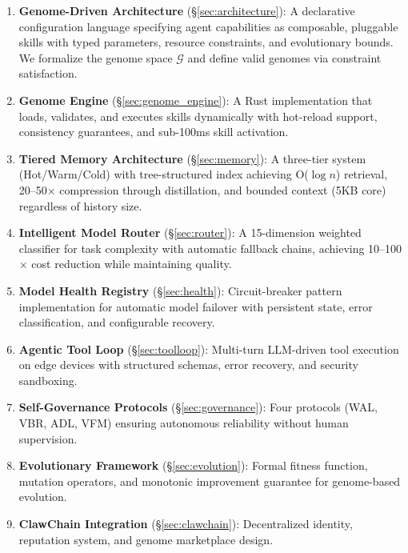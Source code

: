 \documentclass{article}
\newcommand{\genomespace}{\mathcal{G}}
\begin{document}
\begin{enumerate}[leftmargin=*]
    \item \textbf{Genome-Driven Architecture} (\S\ref{sec:architecture}): A declarative configuration language specifying agent capabilities as composable, pluggable skills with typed parameters, resource constraints, and evolutionary bounds. We formalize the genome space $\genomespace$ and define valid genomes via constraint satisfaction.
    
    \item \textbf{Genome Engine} (\S\ref{sec:genome_engine}): A Rust implementation that loads, validates, and executes skills dynamically with hot-reload support, consistency guarantees, and sub-100ms skill activation.
    
    \item \textbf{Tiered Memory Architecture} (\S\ref{sec:memory}): A three-tier system (Hot/Warm/Cold) with tree-structured index achieving O($\log n$) retrieval, 20--50$\times$ compression through distillation, and bounded context (5KB core) regardless of history size.
    
    \item \textbf{Intelligent Model Router} (\S\ref{sec:router}): A 15-dimension weighted classifier for task complexity with automatic fallback chains, achieving 10--100$\times$ cost reduction while maintaining quality.
    
    \item \textbf{Model Health Registry} (\S\ref{sec:health}): Circuit-breaker pattern implementation for automatic model failover with persistent state, error classification, and configurable recovery.
    
    \item \textbf{Agentic Tool Loop} (\S\ref{sec:toolloop}): Multi-turn LLM-driven tool execution on edge devices with structured schemas, error recovery, and security sandboxing.
    
    \item \textbf{Self-Governance Protocols} (\S\ref{sec:governance}): Four protocols (WAL, VBR, ADL, VFM) ensuring autonomous reliability without human supervision.
    
    \item \textbf{Evolutionary Framework} (\S\ref{sec:evolution}): Formal fitness function, mutation operators, and monotonic improvement guarantee for genome-based evolution.
    
    \item \textbf{ClawChain Integration} (\S\ref{sec:clawchain}): Decentralized identity, reputation system, and genome marketplace design.
    

\end{enumerate}
\end{document}
